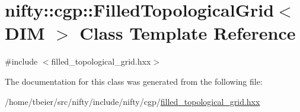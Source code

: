 \hypertarget{classnifty_1_1cgp_1_1FilledTopologicalGrid}{}\section{nifty\+:\+:cgp\+:\+:Filled\+Topological\+Grid$<$ D\+I\+M $>$ Class Template Reference}
\label{classnifty_1_1cgp_1_1FilledTopologicalGrid}


{\ttfamily \#include $<$filled\+\_\+topological\+\_\+grid.\+hxx$>$}



The documentation for this class was generated from the following file\+:\begin{DoxyCompactItemize}
\item 
/home/tbeier/src/nifty/include/nifty/cgp/\hyperlink{filled__topological__grid_8hxx}{filled\+\_\+topological\+\_\+grid.\+hxx}\end{DoxyCompactItemize}
